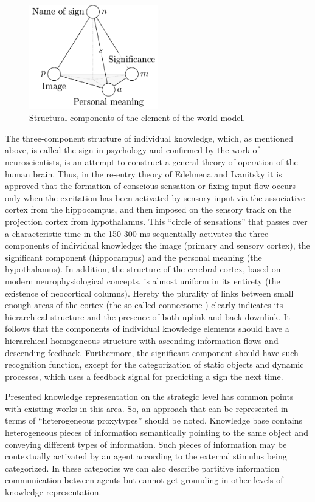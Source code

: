 \documentclass[review]{elsarticle}
\begin{document}
\begin{figure}[h]
	\centering
		\includegraphics[width=0.5\textwidth]{sign_eng-0.png}
	\caption{Structural components of the element of the world model.}
	\label{fig:sign}
\end{figure}

The three-component structure of individual knowledge, which, as mentioned above, is called the sign in psychology and confirmed by the work of neuroscientists, is an attempt to construct a general theory of operation of the human brain. Thus, in the re-entry theory of Edelmena \cite{Edelman1987} and Ivanitsky \cite{Ivanitsky1996} it is approved that the formation of conscious sensation or fixing input flow occurs only when the excitation has been activated by sensory input via the associative cortex from the hippocampus, and then imposed on the sensory track on the projection cortex from hypothalamus. This ``circle of sensations'' that passes over a characteristic time in the 150-300 ms sequentially activates the three components of individual knowledge: the image (primary and sensory cortex), the significant component (hippocampus) and the personal meaning (the hypothalamus). In addition, the structure of the cerebral cortex, based on modern neurophysiological concepts, is almost uniform in its entirety (the existence of neocortical columns). Hereby the plurality of links between small enough areas of the cortex (the so-called connectome \cite{Zador2012}) clearly indicates its hierarchical structure and the presence of both uplink and back downlink. It follows that the components of individual knowledge elements should have a hierarchical homogeneous structure with ascending information flows and descending feedback. Furthermore, the significant component should have such recognition function, except for the categorization of static objects and dynamic processes, which uses a feedback signal for predicting a sign the next time.

Presented knowledge representation on the strategic level has common points with existing works in this area. So, an approach that can be represented in terms of ``heterogeneous proxytypes'' \cite{Lieto2014} should be noted. Knowledge base contains heterogeneous pieces of information semantically pointing to the same object and conveying different types of information. Such pieces of information may be contextually activated by an agent according to the external stimulus being categorized. In these categories we can also describe partitive information communication between agents but cannot get grounding in other levels of knowledge representation.
\end{document}
